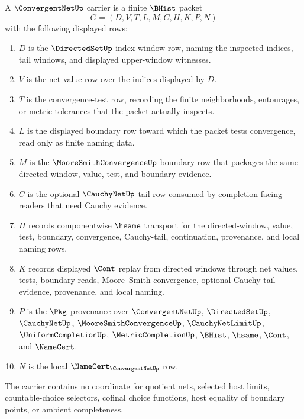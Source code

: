\begin{definition}
\label{def:convergent-net-carrier}
A $\ConvergentNetUp$ carrier is a finite $\BHist$ packet
$$
G=(D,V,T,L,M,C,H,K,P,N)
$$
with the following displayed rows:
\begin{enumerate}
\item $D$ is the $\DirectedSetUp$ index-window row, naming the inspected indices, tail windows, and displayed upper-window witnesses.
\item $V$ is the net-value row over the indices displayed by $D$.
\item $T$ is the convergence-test row, recording the finite neighborhoods, entourages, or metric tolerances that the packet actually inspects.
\item $L$ is the displayed boundary row toward which the packet tests convergence, read only as finite naming data.
\item $M$ is the $\MooreSmithConvergenceUp$ boundary row that packages the same directed-window, value, test, and boundary evidence.
\item $C$ is the optional $\CauchyNetUp$ tail row consumed by completion-facing readers that need Cauchy evidence.
\item $H$ records componentwise $\hsame$ transport for the directed-window, value, test, boundary, convergence, Cauchy-tail, continuation, provenance, and local naming rows.
\item $K$ records displayed $\Cont$ replay from directed windows through net values, tests, boundary reads, Moore--Smith convergence, optional Cauchy-tail evidence, provenance, and local naming.
\item $P$ is the $\Pkg$ provenance over $\ConvergentNetUp$, $\DirectedSetUp$, $\CauchyNetUp$, $\MooreSmithConvergenceUp$, $\CauchyNetLimitUp$, $\UniformCompletionUp$, $\MetricCompletionUp$, $\BHist$, $\hsame$, $\Cont$, and $\NameCert$.
\item $N$ is the local $\NameCert_{\ConvergentNetUp}$ row.
\end{enumerate}
The carrier contains no coordinate for quotient nets, selected host limits, countable-choice selectors, cofinal choice functions, host equality of boundary points, or ambient completeness.
\end{definition}

